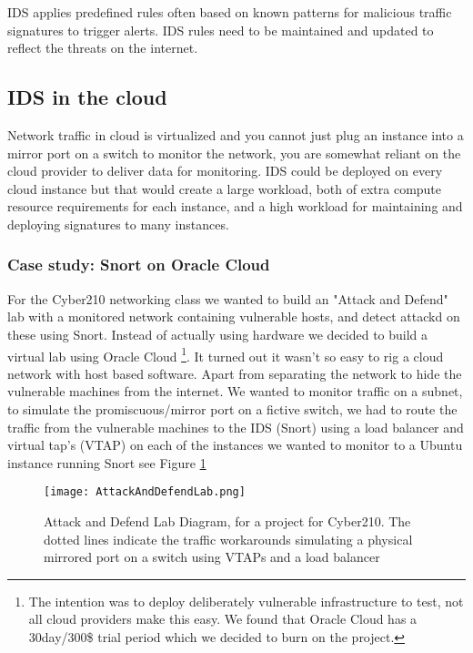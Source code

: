 \documentclass[
	letterpaper, %
	10pt, %
	unnumberedsections, %
	twoside, %
]{APAAssignment}
\begin{document}
IDS applies predefined rules often based on known patterns for malicious traffic signatures to trigger alerts. IDS rules need to be maintained and updated to reflect the threats on the internet.    

\subsection{IDS in the cloud}
Network traffic in cloud is virtualized and you cannot just plug an instance into a mirror port on a switch to monitor the network, you are somewhat reliant on the cloud provider to deliver data for monitoring. IDS could be deployed on every cloud instance but that would create a large workload, both of extra compute resource requirements for each instance, and a high workload for maintaining and deploying signatures to many instances.       

\subsubsection{Case study: Snort on Oracle Cloud}
For the Cyber210 networking class we wanted to build an "Attack and Defend" lab with a monitored network containing vulnerable hosts, and detect attackd on these using Snort. Instead of actually using hardware we decided to build a virtual lab using Oracle Cloud \footnote{The intention was to deploy deliberately
vulnerable infrastructure to test, not all cloud providers make this easy. We found that Oracle Cloud has a 30day/300\$ trial period which we decided to burn on the project.}. It turned out it wasn't so easy to rig a cloud network with host based software. Apart from separating the network to hide the vulnerable machines from the internet. We wanted to monitor traffic on a subnet, to simulate the promiscuous/mirror port on a fictive switch, we had to route the traffic from the vulnerable machines to the IDS (Snort) using a load balancer and virtual tap's (VTAP) on each of the instances we wanted to monitor to a Ubuntu instance running Snort see Figure \ref{fig:AttackAndDefendLab} 

\begin{figure}[!htp] %
	\centering
	\texttt{[image: AttackAndDefendLab.png]}
	\caption{Attack and Defend Lab Diagram, for a project for Cyber210. The dotted lines indicate the traffic workarounds simulating a physical mirrored port on a switch using VTAPs and a load balancer}
	\label{fig:AttackAndDefendLab}
\end{figure}
\end{document}

